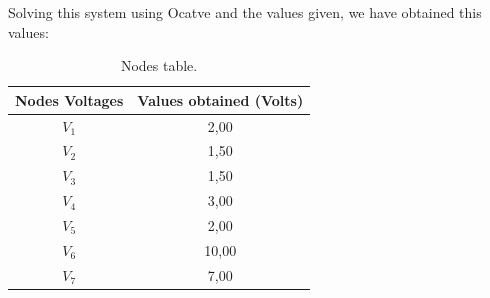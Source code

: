 \noindent Solving this system using Ocatve and the values given, we have obtained this values:
\begin{table}[h!]
\centering
\begin{small}
\caption{Nodes table.} \label{Table3}
\begin{tabular}{c|c}
\hline
Nodes Voltages & Values obtained (Volts)\\
\hline
$V_1$           & 2,00 \\
$V_2$  & 1,50 \\
$V_3$         & 1,50 \\
$V_4$   & 3,00 \\
$V_5$              & 2,00 \\
$V_6$                  & 10,00 \\
$V_7$     &  7,00 \\
\hline
\end{tabular}
\end{small}
\end{table}

